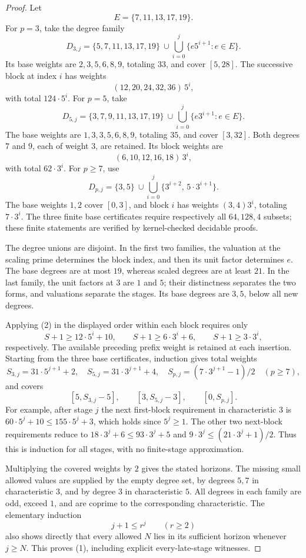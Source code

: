 \documentclass[11pt]{article}
\begin{document}
\begin{proof}
Let
\[
                       E=\{7,11,13,17,19\}.
\]
For \(p=3\), take the degree family
\[
 D_{3,j}=\{5,7,11,13,17,19\}
       \ \cup\bigcup_{i=0}^j\{e5^{i+1}:e\in E\}.
\]
Its base weights are \(2,3,5,6,8,9\), totaling \(33\), and cover
\([5,28]\). The successive block at index \(i\) has weights
\[
                   (12,20,24,32,36)\,5^i,
\]
with total \(124\cdot5^i\).
For \(p=5\), take
\[
 D_{5,j}=\{3,7,9,11,13,17,19\}
       \ \cup\bigcup_{i=0}^j\{e3^{i+1}:e\in E\}.
\]
The base weights are \(1,3,3,5,6,8,9\), totaling \(35\), and cover
\([3,32]\). Both degrees \(7\) and \(9\), each of weight \(3\),
are retained. Its block weights are
\[
                     (6,10,12,16,18)\,3^i,
\]
with total \(62\cdot3^i\).
For \(p\ge7\), use
\[
 D_{p,j}=\{3,5\}\ \cup\bigcup_{i=0}^j
                         \{3^{i+2},\,5\cdot3^{i+1}\}.
\]
The base weights \(1,2\) cover \([0,3]\), and block \(i\) has
weights \((3,4)3^i\), totaling \(7\cdot3^i\).
The three finite base certificates require respectively all
\(64,128,4\) subsets; these finite statements are verified by
kernel-checked decidable proofs.

The degree unions are disjoint. In the first two families, the
valuation at the scaling prime determines the block index, and
then its unit factor determines \(e\). The base degrees are at most
\(19\), whereas scaled degrees are at least \(21\).
In the last family, the unit factors at \(3\) are \(1\) and \(5\);
their distinctness separates the two forms, and valuations separate
the stages. Its base degrees are \(3,5\), below all new degrees.

Applying (2) in the displayed order within each block requires only
\[
 S+1\ge12\cdot5^i+10,\qquad
 S+1\ge6\cdot3^i+6,\qquad
 S+1\ge3\cdot3^i,
\]
respectively. The available preceding prefix weight is retained at
each insertion. Starting from the three base certificates, induction
gives total weights
\[
 S_{3,j}=31\cdot5^{j+1}+2,\quad
 S_{5,j}=31\cdot3^{j+1}+4,\quad
 S_{p,j}=(7\cdot3^{j+1}-1)/2\quad(p\ge7),
\]
and covers
\[
 [5,S_{3,j}-5],\qquad [3,S_{5,j}-3],\qquad[0,S_{p,j}].
\]
For example, after stage \(j\) the next first-block requirement in
characteristic \(3\) is
\(60\cdot5^j+10\le155\cdot5^j+3\), which holds since \(5^j\ge1\).
The other two next-block requirements reduce to
\(18\cdot3^j+6\le93\cdot3^j+5\) and
\(9\cdot3^j\le(21\cdot3^j+1)/2\).
Thus this is induction for all stages, with no finite-stage
approximation.

Multiplying the covered weights by \(2\) gives the stated horizons.
The missing small allowed values are supplied by the empty degree
set, by degrees \(5,7\) in characteristic \(3\), and by degree \(3\)
in characteristic \(5\). All degrees in each family are odd, exceed
\(1\), and are coprime to the corresponding characteristic.
The elementary induction
\[
                          j+1\le r^j\qquad(r\ge2)
\]
also shows directly that every allowed \(N\) lies in its sufficient
horizon whenever \(j\ge N\). This proves (1), including explicit
every-late-stage witnesses.


\end{proof}
\end{document}
